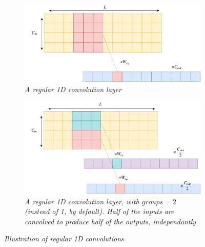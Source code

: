 \documentclass{article}
\begin{document}
\begin{figure}
    \begin{subfigure}{.49\linewidth}
        \centering
        \includegraphics[width=.8\linewidth]{img/1D-conv.pdf}
        \caption{\textit{A regular 1D convolution layer}}
        \label{fig:regular-conv-layer}
    \end{subfigure}
    \begin{subfigure}{.49\linewidth}
        \centering
        \includegraphics[width=.8\linewidth]{img/1D-conv-groups.pdf}
        \caption{\textit{A regular 1D convolution layer, with $groups=2$ (instead of 1, by default). Half of the inputs are convolved to produce half of the outputs, independantly}}
        \label{fig:regular-conv-layer-with-groups}
    \end{subfigure}
    \caption{\textit{Illustration of regular 1D convolutions}}
\end{figure}
\end{document}
